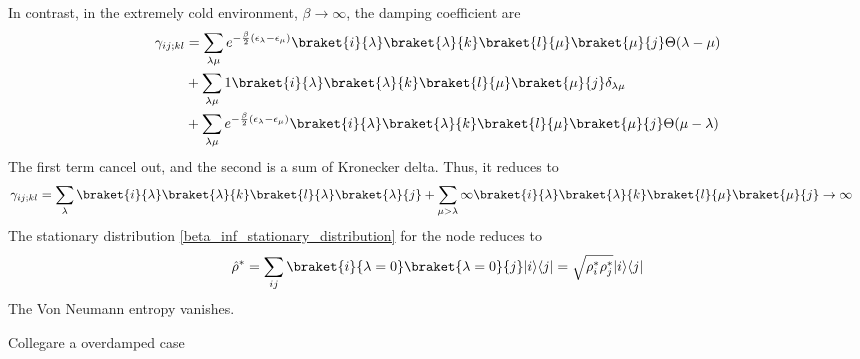 In contrast, in the extremely cold environment, $\beta \rightarrow \infty$, the damping coefficient are
\begin{equation}
    \begin{split}
        \gamma_{ij;kl}&= \sum_{\lambda\mu}e^{-\frac{\beta}{2}\left(\epsilon_\lambda - \epsilon_\mu\right)}\braket{i}{\lambda}\braket{\lambda}{k}\braket{l}{\mu}\braket{\mu}{j}\Theta(\lambda-\mu)\\
        & + \sum_{\lambda\mu} 1\braket{i}{\lambda}\braket{\lambda}{k}\braket{l}{\mu}\braket{\mu}{j}\delta_{\lambda\mu}\\
        & + \sum_{\lambda\mu} e^{-\frac{\beta}{2}\left(\epsilon_\lambda - \epsilon_\mu\right)}\braket{i}{\lambda}\braket{\lambda}{k}\braket{l}{\mu}\braket{\mu}{j}\Theta(\mu-\lambda)
    \end{split}
\end{equation}
The first term cancel out,  and the second is a sum of Kronecker delta. Thus, it reduces to
\begin{equation}\label{gamma_T=0}
    \begin{split}
        \gamma_{ij;kl}&= \sum_{\lambda}\braket{i}{\lambda}\braket{\lambda}{k}\braket{l}{\lambda}\braket{\lambda}{j}+ \sum_{\mu>\lambda}\infty\braket{i}{\lambda}\braket{\lambda}{k}\braket{l}{\mu}\braket{\mu}{j} \rightarrow \infty
    \end{split}
\end{equation}
The stationary distribution \eqref{beta_inf_stationary_distribution} for the node reduces to
\begin{equation}
    \hat\rho^* = \sum_{ij} \braket{i}{\lambda = 0}\braket{\lambda = 0}{j} \ket{i}\bra{j} = \sqrt{\rho^*_i\rho^*_j} \ket{i}\bra{j}
\end{equation}
The Von Neumann entropy vanishes. 

Collegare a overdamped case 



